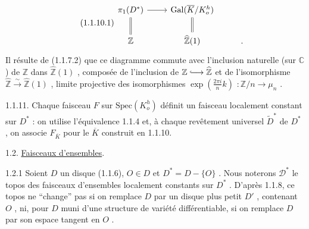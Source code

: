 \begin{equation}\tag{1.1.10.1}
\begin{tikzcd}
\pi_1(D^*) \arrow[r] \arrow[d, equal] & \mathrm{Gal}(\overline{K}/K_o^h) \arrow[d, equal] & \\
\mathbb{Z} & \widehat{\mathbb{Z}}(1) & .
\end{tikzcd}
\end{equation}
Il résulte de (1.1.7.2) que ce diagramme commute avec l'inclusion naturelle (sur $\mathbb{C}$ ) de $\mathbb{Z}$ dans $\widehat{\mathbb{Z}}(1)$ , composée de l'inclusion de $\mathbb{Z} \lhook\joinrel\longrightarrow \widehat{\mathbb{Z}}$ et de l'isomorphisme $\widehat{\mathbb{Z}} \overset{\sim}{\longrightarrow} \widehat{\mathbb{Z}}(1)$ , limite projective des isomorphismes $\exp(\frac{2\pi i}{n} k )$ $: \mathbb{Z}/n \to \mu_n$ .

1.1.11. Chaque faisceau $F$ sur $\mathrm{Spec}(K_o^h)$ définit un faisceau localement constant sur $D^*$ : on utilise l'équivalence 1.1.4 et, à chaque revêtement universel $\widetilde{D}^*$ de $D^*$ , on associe $F_{\overline{K}}$ pour le $\overline{K}$ construit en 1.1.10.


1.2. \underline{Faisceaux d'ensembles}.

1.2.1 Soient $D$ un disque (1.1.6), $O \in D$ et $D^* = D-\{O\}$ . Nous noterons $\mathcal{D}^*$
le topos des faisceaux d'ensembles localement constants sur $D^*$ . D'après 1.1.8, ce topos ne ``change'' pas si on remplace $D$ par un disque plus petit $D'$ , contenant $O$ , ni, pour $D$ muni d'une structure de variété différentiable, si on remplace $D$ par son espace tangent en $O$ .

